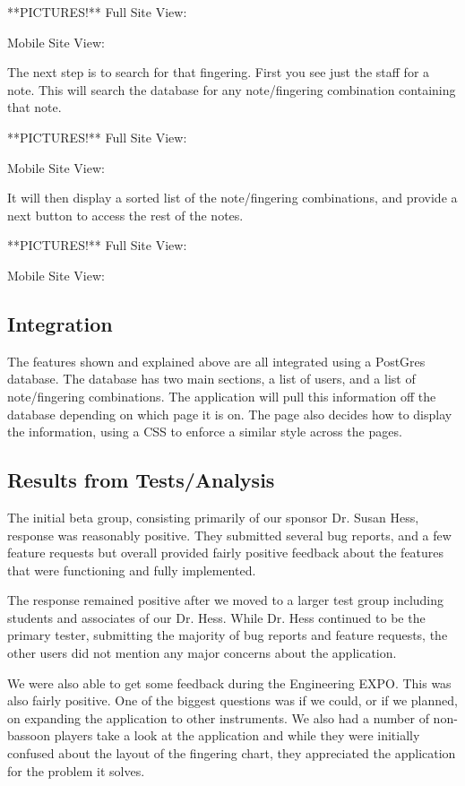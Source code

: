 \documentclass[12pt,english]{article}
\begin{document}
**PICTURES!**
Full Site View:

Mobile Site View:

The next step is to search for that fingering.  First you see just the staff
for a note. This will search the database for any note/fingering combination
containing that note.

**PICTURES!**
Full Site View:

Mobile Site View:


It will then display a sorted list of the note/fingering combinations, and 
provide a next button to access the rest of the notes.

**PICTURES!**
Full Site View:

Mobile Site View:

\subsection{Integration}
The features shown and explained above are all integrated using a PostGres
database. The database has two main sections, a list of users, and a list of
note/fingering combinations. The application will pull this information off
the database depending on which page it is on. The page also decides how to
display the information, using a CSS to enforce a similar style across the
pages. 

\subsection{Results from Tests/Analysis}

The initial beta group, consisting primarily of our sponsor Dr. Susan
Hess, response was reasonably positive. They submitted several bug
reports, and a few feature requests but overall provided fairly positive
feedback about the features that were functioning and fully implemented.

The response remained positive after we moved to a larger test group
including students and associates of our Dr. Hess. While Dr. Hess
continued to be the primary tester, submitting the majority of bug
reports and feature requests, the other users did not mention any
major concerns about the application.

We were also able to get some feedback during the Engineering EXPO.
This was also fairly positive. One of the biggest questions was if
we could, or if we planned, on expanding the application to other
instruments. We also had a number of non-bassoon players take a look
at the application and while they were initially confused about the
layout of the fingering chart, they appreciated the application for
the problem it solves.
\end{document}
